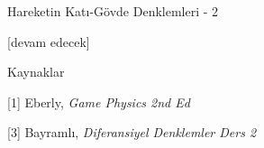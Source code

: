 \documentclass[12pt,fleqn]{article}\usepackage{../../common}
\begin{document}
Hareketin Katı-Gövde Denklemleri - 2



















[devam edecek]

Kaynaklar

[1] Eberly, {\em Game Physics 2nd Ed}

[3] Bayramlı, {\em Diferansiyel Denklemler Ders 2}
\end{document}
